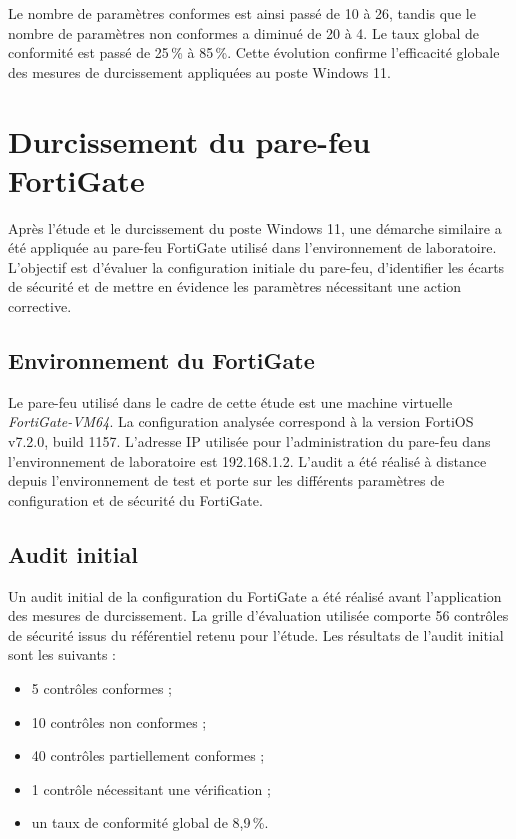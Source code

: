 Le nombre de paramètres conformes est ainsi passé de 10 à 26, tandis que le nombre de paramètres non conformes a diminué de 20 à 4. Le taux global de conformité est passé de 25\,\% à 85\,\%. Cette évolution confirme l'efficacité globale des mesures de durcissement appliquées au poste Windows 11.

\section{Durcissement du pare-feu FortiGate}

Après l'étude et le durcissement du poste Windows 11, une démarche similaire a été appliquée au pare-feu FortiGate utilisé dans l'environnement de laboratoire. L'objectif est d'évaluer la configuration initiale du pare-feu, d'identifier les écarts de sécurité et de mettre en évidence les paramètres nécessitant une action corrective.

\subsection{Environnement du FortiGate}

Le pare-feu utilisé dans le cadre de cette étude est une machine virtuelle \emph{FortiGate-VM64}. La configuration analysée correspond à la version FortiOS v7.2.0, build 1157. L'adresse IP utilisée pour l'administration du pare-feu dans l'environnement de laboratoire est 192.168.1.2. L'audit a été réalisé à distance depuis l'environnement de test et porte sur les différents paramètres de configuration et de sécurité du FortiGate.

\subsection{Audit initial}

Un audit initial de la configuration du FortiGate a été réalisé avant l'application des mesures de durcissement. La grille d'évaluation utilisée comporte 56 contrôles de sécurité issus du référentiel retenu pour l'étude. Les résultats de l'audit initial sont les suivants :
\begin{itemize}
  \item 5 contrôles conformes ;
  \item 10 contrôles non conformes ;
  \item 40 contrôles partiellement conformes ;
  \item 1 contrôle nécessitant une vérification ;
  \item un taux de conformité global de 8,9\,\%.
\end{itemize}


